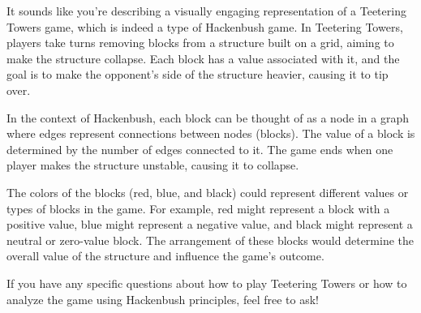 It sounds like you're describing a visually engaging representation of a Teetering Towers game, which is indeed a type of Hackenbush game. In Teetering Towers, players take turns removing blocks from a structure built on a grid, aiming to make the structure collapse. Each block has a value associated with it, and the goal is to make the opponent's side of the structure heavier, causing it to tip over.

In the context of Hackenbush, each block can be thought of as a node in a graph where edges represent connections between nodes (blocks). The value of a block is determined by the number of edges connected to it. The game ends when one player makes the structure unstable, causing it to collapse.

The colors of the blocks (red, blue, and black) could represent different values or types of blocks in the game. For example, red might represent a block with a positive value, blue might represent a negative value, and black might represent a neutral or zero-value block. The arrangement of these blocks would determine the overall value of the structure and influence the game's outcome.

If you have any specific questions about how to play Teetering Towers or how to analyze the game using Hackenbush principles, feel free to ask!